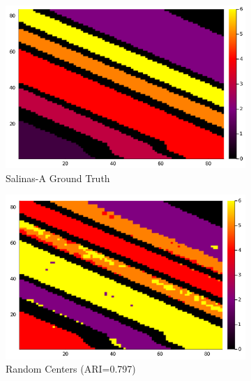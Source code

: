 \documentclass[a4paper,10pt]{article}
\begin{document}
\begin{figure}[ht]
      \centering
      \begin{subfigure}[b]{0.4\textwidth}
            \centering
            \includegraphics[width=\linewidth]{salinasgt.png}
            \caption{Salinas-A Ground Truth}
            \label{fig:salinasgt}
      \end{subfigure}
      \begin{subfigure}[b]{0.4\textwidth}
            \centering
            \includegraphics[width=\linewidth]{risodata.png}
            \caption{Random Centers (ARI=0.797)}
            \label{fig:salinasr}
      \end{subfigure}\hfill
      \centering
      \begin{subfigure}[b]{0.4\textwidth}
            \centering

\end{subfigure}
\end{figure}
\end{document}
